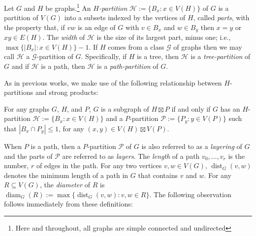 \documentclass{patmorin}
\newcommand{\defin}[1]{\emph{\color{brightmaroon}#1}}
\DeclareMathOperator{\dist}{dist}
\DeclareMathOperator{\diam}{diam}
\begin{document}
Let $G$ and $H$ be graphs.\footnote{Here and throughout, all graphs are simple connected and undirected}  
An \defin{$H$-partition} $\mathcal{H}:=\{B_x:x\in V(H)\}$ of $G$ is a partition  of $V(G)$ into a subsets indexed by the vertices of $H$, called \defin{parts}, with the property that, if $vw$ is an edge of $G$ with $v\in B_x$ and $w\in B_y$ then $x=y$ or $xy\in E(H)$.  The \defin{width} of $\mathcal{H}$ is the size of its largest part, minus one; i.e., $\max\{|B_x|:x\in V(H)\}-1$.  If $H$ comes from a class $\mathcal{G}$ of graphs then we may call $\mathcal{H}$ a $\mathcal{G}$-partition of $G$.  Specifically, if $H$ is a tree, then $\mathcal{H}$ is a \defin{tree-partition} of $G$ and if $\mathcal{H}$ is a path, then $\mathcal{H}$ is a \defin{path-partition} of $G$.


As in previous works, we make use of the following relationship between $H$-partitions and strong products:

\begin{obs}\label{layered_partitions_vs_strong_products}
  For any graphs $G$, $H$, and $P$,  $G$ is a subgraph of $H\boxtimes P$ if and only if $G$ has an $H$-partition $\mathcal{H}:=\{B_x:x\in V(H)\}$ and a $P$-partition $\mathcal{P}:=\{P_y:y\in V(P)\}$ such that $|B_x\cap P_y|\le 1$, for any $(x,y)\in V(H)\boxtimes V(P)$.
\end{obs}

When $P$ is a path, then a $P$-partition $\mathcal{P}$ of $G$ is also referred to as a \defin{layering} of $G$ and the parts of $\mathcal{P}$ are referred to as \defin{layers}.  The \defin{length} of a path $v_0,\ldots,v_r$ is the number, $r$ of edges in the path. For any two vertices $v,w\in V(G)$, $\dist_G(v,w)$ denotes the minimum length of a path in $G$ that contains $v$ and $w$. For any $R\subseteq V(G)$, the \defin{diameter} of $R$ is $\diam_G(R):=\max\{\dist_G(v,w):v,w\in R\}$.  The following observation follows immediately from these definitions:
\end{document}
